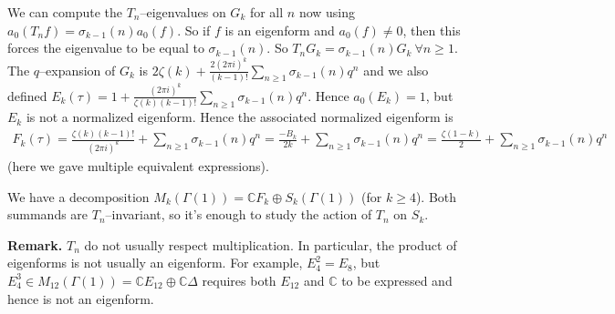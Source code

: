 \documentclass{article}
\theoremstyle{definition}
\begin{document}
We can compute the $T_n$--eigenvalues on $G_k$ for all $n$ now using $a_0(T_n f) = \sigma_{k-1}(n)a_0(f)$. So if $f$ is an eigenform and $a_0(f) \neq 0$, then this forces the eigenvalue to be equal to $\sigma_{k-1}(n)$. So $T_n G_k = \sigma_{k-1}(n)G_k ~\forall n\ge 1$. The $q$--expansion of $G_k$ is $2\zeta(k) + \frac{2(2\pi i)^k}{(k-1)!}\sum_{n\ge 1}^{} \sigma_{k-1}(n)q^n$ and we also defined $E_k(\tau) = 1 + \frac{(2\pi i)^k}{\zeta(k)(k-1)!} \sum_{n\ge 1}^{} \sigma_{k-1}(n)q^n$. Hence $a_0(E_k) = 1$, but $E_k$ is not a normalized eigenform. Hence the associated normalized eigenform is 
    \begin{align*}
        F_k(\tau) = \frac{\zeta(k)(k-1)!}{(2\pi i)^k} + \sum_{n\ge 1}^{} \sigma_{k-1}(n)q^n = \frac{-B_k}{2k} + \sum_{n\ge 1}^{} \sigma_{k-1}(n)q^n = \frac{\zeta(1-k)}{2} + \sum_{n\ge 1}^{} \sigma_{k-1}(n)q^n
    \end{align*}
(here we gave multiple equivalent expressions).
\vspace{1mm}
    
We have a decomposition $M_k(\Gamma(1)) = \mathbb{C} F_k \oplus S_k(\Gamma(1))$ (for $k\ge 4$). Both summands are $T_n$--invariant, so it's enough to study the action of $T_n$ on $S_k$.
\vspace{1mm}
 
\textbf{Remark.} $T_n$ do not usually respect multiplication. In particular, the product of eigenforms is not usually an eigenform. For example, $E_4^2 = E_8$, but $E_4^3 \in M_{12}(\Gamma(1)) = \mathbb{C}E_{12} \oplus \mathbb{C} \Delta$ requires both $E_{12}$ and $\mathbb{C}$ to be expressed and hence is not an eigenform.
\end{document}
